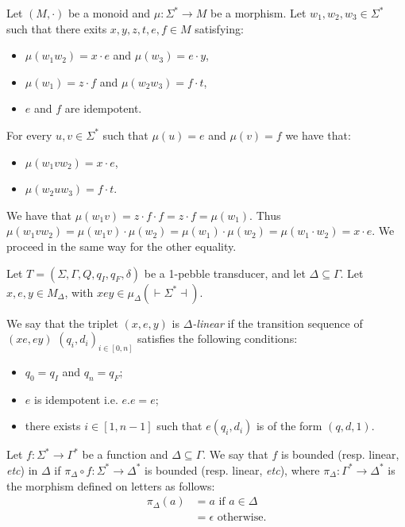 \begin{lemma}\label{lem:2idem}
Let $(M,\cdot)$ be a monoid and $\mu:\Sigma^*\to M$ be a morphism. Let $w_1,w_2, w_3\in\Sigma^*$ such that there exits $x,y,z,t,e,f\in M$ satisfying:
\begin{itemize}
\item $\mu(w_1w_2)=x\cdot e$ and $\mu(w_3)=e\cdot y$,
\item $\mu(w_1)=z\cdot f$ and $\mu(w_2w_3)=f\cdot t$,
\item $e$ and $f$ are idempotent.
\end{itemize}
For every $u, v\in\Sigma^*$ such that $\mu(u)=e$ and $\mu(v)=f$ we have that:
\begin{itemize}
\item $\mu(w_1vw_2)=x\cdot e$, 
\item $\mu(w_2uw_3)=f\cdot t$.
\end{itemize}
\end{lemma}

\begin{pr}
We have that $\mu(w_1v)=z\cdot f\cdot f=z\cdot f=\mu(w_1)$.
Thus $\mu(w_1vw_2)=\mu(w_1v)\cdot \mu(w_2)=\mu(w_1)\cdot \mu(w_2)=\mu(w_1\cdot w_2) =x\cdot e$.
We proceed in the same way for the other equality.
\end{pr}

\begin{definition}
Let $T=(\Sigma,\Gamma,Q,q_I,q_F, \delta)$ be a 1-pebble transducer, and let $\Delta\subseteq \Gamma$. Let $x, e, y\in M_\Delta$, with $xey\in \mu_\Delta( { \vdash}\Sigma^*{ \dashv})$.

We say that the triplet $(x,e,y)$ is \emph{$\Delta$-linear} if the transition sequence of $(xe,ey)$
$(q_i,d_i)_{i\in[0,n]}$ satisfies the following conditions:
\begin{itemize}
\item $q_0=q_I$ and $q_n=q_F$;
\item $e$ is idempotent i.e. $e.e=e$;
\item there exists $i\in [1,n-1]$ such that $e(q_i,d_i)$ is of the form $(q,d,1)$.
\end{itemize}
\end{definition}

 \begin{definition}
Let $f:\Sigma^*\to \Gamma^*$ be a function and $\Delta\subseteq\Gamma$. We say that $f$ is bounded (resp. linear, \textit{etc}) in $\Delta$ if $\pi_\Delta\circ f: \Sigma^*\to \Delta^*$ is bounded (resp. linear, \textit{etc}), where $\pi_\Delta:\Gamma^*\to \Delta^*$ is the morphism defined on letters as follows:
\begin{align*}
\pi_\Delta(a)&=a \text{ if }  a\in \Delta \\
&= \epsilon \text{ otherwise.}
\end{align*}
 \end{definition}
 

